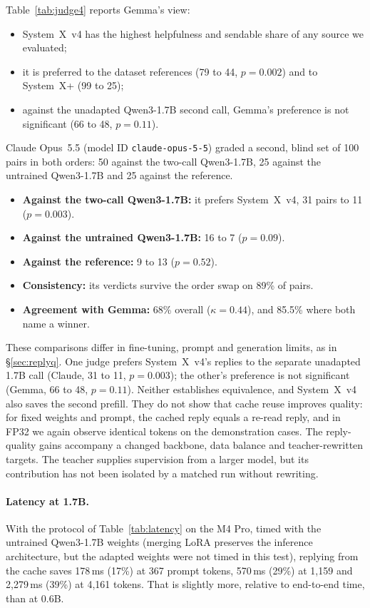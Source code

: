 \documentclass[11pt]{article}
\newcommand{\sysplus}{System~X+}
\newcommand{\sysfour}{System~X~v4}
\begin{document}
Table~\ref{tab:judge4} reports Gemma's view:
\begin{itemize}
\item \sysfour{} has the highest helpfulness and sendable share of any source we evaluated;
\item it is preferred to the dataset references (79 to 44, $p=0.002$) and to \sysplus{} (99 to 25);
\item against the unadapted Qwen3-1.7B second call, Gemma's preference is not significant (66 to 48, $p=0.11$).
\end{itemize}
Claude Opus~5.5 (model ID \texttt{claude-opus-5-5}) graded a second, blind set of 100 pairs in both orders: 50 against the two-call Qwen3-1.7B, 25 against the untrained Qwen3-1.7B and 25 against the reference.
\begin{itemize}
\item \textbf{Against the two-call Qwen3-1.7B:} it prefers \sysfour{}, 31 pairs to 11 ($p=0.003$).
\item \textbf{Against the untrained Qwen3-1.7B:} 16 to 7 ($p=0.09$).
\item \textbf{Against the reference:} 9 to 13 ($p=0.52$).
\item \textbf{Consistency:} its verdicts survive the order swap on 89\% of pairs.
\item \textbf{Agreement with Gemma:} 68\% overall ($\kappa=0.44$), and 85.5\% where both name a winner.
\end{itemize}
These comparisons differ in fine-tuning, prompt and generation limits, as in \S\ref{sec:replyq}. One judge prefers \sysfour{}'s replies to the separate unadapted 1.7B call (Claude, 31 to 11, $p=0.003$); the other's preference is not significant (Gemma, 66 to 48, $p=0.11$). Neither establishes equivalence, and \sysfour{} also saves the second prefill. They do not show that cache reuse improves quality: for fixed weights and prompt, the cached reply equals a re-read reply, and in FP32 we again observe identical tokens on the demonstration cases. The reply-quality gains accompany a changed backbone, data balance and teacher-rewritten targets. The teacher supplies supervision from a larger model, but its contribution has not been isolated by a matched run without rewriting.

\paragraph{Latency at 1.7B.} With the protocol of Table~\ref{tab:latency} on the M4 Pro, timed with the untrained Qwen3-1.7B weights (merging LoRA preserves the inference architecture, but the adapted weights were not timed in this test), replying from the cache saves 178\,ms (17\%) at 367 prompt tokens, 570\,ms (29\%) at 1{,}159 and 2{,}279\,ms (39\%) at 4{,}161 tokens. That is slightly more, relative to end-to-end time, than at 0.6B.
\end{document}
